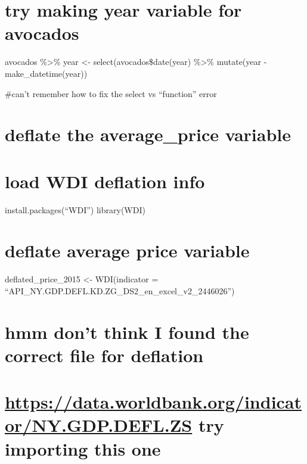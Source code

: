 \documentclass[
]{article}
\begin{document}
\hypertarget{try-making-year-variable-for-avocados}{%
\section{try making year variable for
avocados}\label{try-making-year-variable-for-avocados}}

avocados \%\textgreater\% year \textless- select(avocados\$date(year)
\%\textgreater\% mutate(year - make\_datetime(year))

\#can't remember how to fix the select vs ``function'' error

\hypertarget{deflate-the-average_price-variable}{%
\section{deflate the average\_price
variable}\label{deflate-the-average_price-variable}}

\hypertarget{load-wdi-deflation-info}{%
\section{load WDI deflation info}\label{load-wdi-deflation-info}}

install.packages(``WDI'') library(WDI)

\hypertarget{deflate-average-price-variable}{%
\section{deflate average price
variable}\label{deflate-average-price-variable}}

deflated\_price\_2015 \textless- WDI(indicator =
``API\_NY.GDP.DEFL.KD.ZG\_DS2\_en\_excel\_v2\_2446026'')

\hypertarget{hmm-dont-think-i-found-the-correct-file-for-deflation}{%
\section{hmm don't think I found the correct file for
deflation}\label{hmm-dont-think-i-found-the-correct-file-for-deflation}}

\hypertarget{httpsdata.worldbank.orgindicatorny.gdp.defl.zs-try-importing-this-one}{%
\section{\texorpdfstring{\url{https://data.worldbank.org/indicator/NY.GDP.DEFL.ZS}
try importing this
one}{https://data.worldbank.org/indicator/NY.GDP.DEFL.ZS try importing this one}}\label{httpsdata.worldbank.orgindicatorny.gdp.defl.zs-try-importing-this-one}}
\end{document}
